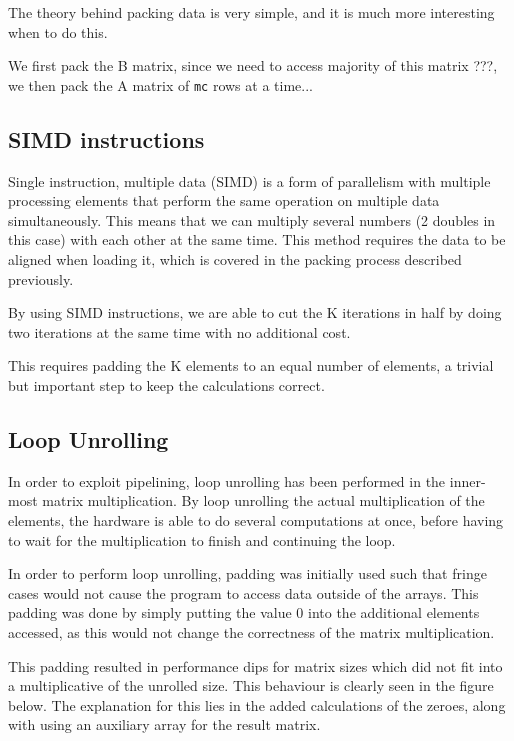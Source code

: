 \documentclass[a4paper,11pt,oneside]{book}
\begin{document}
The theory behind packing data is very simple, and it is much more interesting when to do this. 

We first pack the B matrix, since we need to access majority of this matrix ???, we then pack the A matrix of \verb!mc! rows at a time... %

\subsection{SIMD instructions}
Single instruction, multiple data (SIMD) is a form of parallelism with multiple processing elements that perform the same operation on multiple data simultaneously. This means that we can multiply several numbers (2 doubles in this case) with each other at the same time. This method requires the data to be aligned when loading it, which is covered in the packing process described previously.

By using SIMD instructions, we are able to cut the K iterations in half by doing two iterations at the same time with no additional cost. %

This requires padding the K elements to an equal number of elements, a trivial but important step to keep the calculations correct.

\subsection{Loop Unrolling}
In order to exploit pipelining, loop unrolling has been performed in the inner-most matrix multiplication. By loop unrolling the actual multiplication of the elements, the hardware is able to do several computations at once, before having to wait for the multiplication to finish and continuing the loop.


In order to perform loop unrolling, padding was initially used such that fringe cases would not cause the program to access data outside of the arrays. This padding was done by simply putting the value 0 into the additional elements accessed, as this would not change the correctness of the matrix multiplication.

This padding resulted in performance dips for matrix sizes which did not fit into a multiplicative of the unrolled size. This behaviour is clearly seen in the figure below. The explanation for this lies in the added calculations of the zeroes, along with using an auxiliary array for the result matrix.
\end{document}
